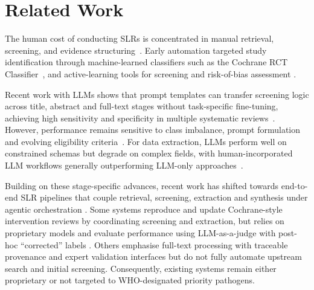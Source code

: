 \section{Related Work}
The human cost of conducting SLRs is concentrated in manual retrieval, screening, and evidence structuring~\citep{page2021prisma,marshall2019toward}. Early automation targeted study identification through machine-learned classifiers such as the Cochrane RCT Classifier~\citep{thomas2021machine}, and active-learning tools for screening \citep{gates2018technologyAbstrackr,przybyla2018prioritising, chai2021research} and risk-of-bias assessment \citep{gates2018technologyRobotReviewer}.

Recent work with LLMs shows that prompt templates can transfer screening logic across title, abstract and full-text stages without task-specific fine-tuning, achieving high sensitivity and specificity in multiple systematic reviews~\citep{ottoSRPromptPaper,homiar2025development}. However, performance remains sensitive to class imbalance, prompt formulation and evolving eligibility criteria~\citep{khraisha2024can,syriani2024screening}. For data extraction, LLMs perform well on constrained schemas but degrade on complex fields, with human-incorporated LLM workflows generally outperforming LLM-only approaches~\citep{gartlehner2024data,mahmoudi2025critical,lai2025language}.

Building on these stage-specific advances, recent work has shifted towards end-to-end SLR pipelines that couple retrieval, screening, extraction and synthesis under agentic orchestration \citep{scherbakov2025emergence}. Some systems reproduce and update Cochrane-style intervention reviews by coordinating screening and extraction, but relies on proprietary models and evaluate performance using LLM-as-a-judge with post-hoc ``corrected'' labels \citep{ottosrCao2025automation}. Others emphasise full-text processing with traceable provenance and expert validation interfaces \citep{parkinson2025metabeeai} but do not fully automate upstream search and initial screening. Consequently, existing systems remain either proprietary or not targeted to WHO-designated priority pathogens.
